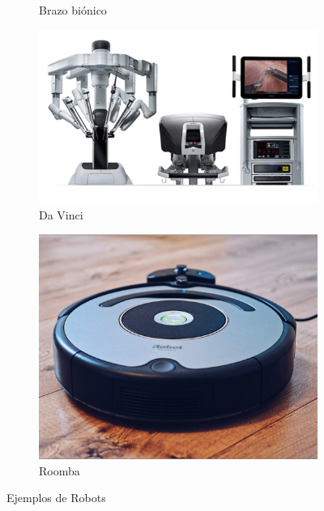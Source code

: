 \begin{figure}[h]
\begin{subfigure}[b]{0.25\textwidth}
    \caption{Brazo biónico}
    \label{fig:f4}
  \end{subfigure}
  \hfill
   \begin{subfigure}[b]{0.25\textwidth}
    \includegraphics[width=\textwidth, height=\textwidth]{chapters/images/davinci.png}
    \caption{Da Vinci }
    \label{fig:f5}
  \end{subfigure}
  \hfill
   \begin{subfigure}[b]{0.25\textwidth}
    \includegraphics[width=\textwidth, height=\textwidth]{chapters/images/roomba.png}
    \caption{Roomba}
    \label{fig:f6}
  \end{subfigure}
  \caption{Ejemplos de Robots}
\end{figure}

